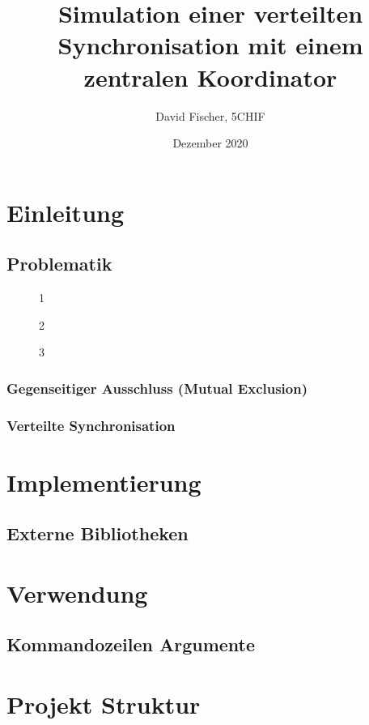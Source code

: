 \documentclass[12pt, letterpaper]{article}
\title{Simulation einer verteilten Synchronisation mit einem zentralen Koordinator}
\author{David Fischer, 5CHIF}
\date{Dezember 2020}
\begin{document}
\begin{titlepage}
\maketitle
\end{titlepage}

\tableofcontents
\newpage

\section{Einleitung}

\subsection{Problematik}

\begin{figure}[H]
    \centering
    \resizebox{0.5\textwidth}{!}{}
    \caption{1}
    \label{fig:situation1}
\end{figure}

\begin{figure}[H]
    \centering
    \resizebox{0.5\textwidth}{!}{}
    \caption{2}
    \label{fig:situation2}
\end{figure}


\begin{figure}[H]
    \centering
    \resizebox{0.5\textwidth}{!}{}
    \caption{3}
    \label{fig:situation3}
\end{figure}


\subsubsection{Gegenseitiger Ausschluss (Mutual Exclusion)}

\subsubsection{Verteilte Synchronisation}

\section{Implementierung}

\subsection{Externe Bibliotheken}

\section{Verwendung}

\subsection{Kommandozeilen Argumente}

\section{Projekt Struktur}


\newpage


\end{document}
